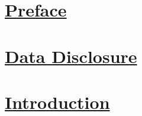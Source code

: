 \section{\underline{Preface}}





\newpage
\section{\underline{Data Disclosure}}




\newpage
\section{\underline{Introduction}}



\newpage



\newpage






\newpage





\newpage




